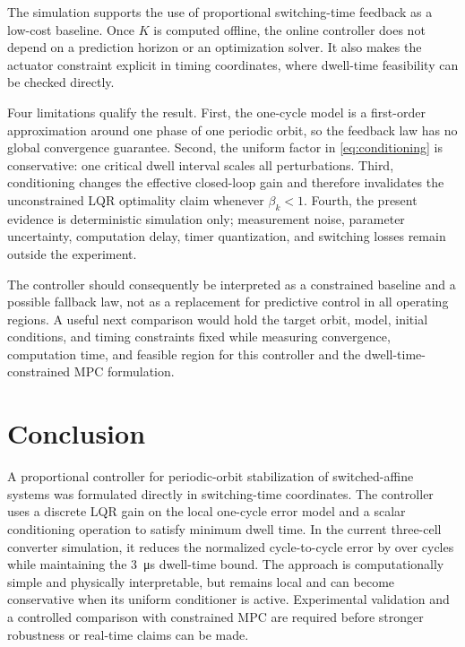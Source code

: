 \documentclass[11pt]{article}
\begin{document}
The simulation supports the use of proportional switching-time feedback as a low-cost baseline. Once $K$ is computed offline, the online controller does not depend on a prediction horizon or an optimization solver. It also makes the actuator constraint explicit in timing coordinates, where dwell-time feasibility can be checked directly.

Four limitations qualify the result. First, the one-cycle model is a first-order approximation around one phase of one periodic orbit, so the feedback law has no global convergence guarantee. Second, the uniform factor in \eqref{eq:conditioning} is conservative: one critical dwell interval scales all perturbations. Third, conditioning changes the effective closed-loop gain and therefore invalidates the unconstrained LQR optimality claim whenever $\beta_k<1$. Fourth, the present evidence is deterministic simulation only; measurement noise, parameter uncertainty, computation delay, timer quantization, and switching losses remain outside the experiment.

The controller should consequently be interpreted as a constrained baseline and a possible fallback law, not as a replacement for predictive control in all operating regions. A useful next comparison would hold the target orbit, model, initial conditions, and timing constraints fixed while measuring convergence, computation time, and feasible region for this controller and the dwell-time-constrained MPC formulation.

\section{Conclusion}

A proportional controller for periodic-orbit stabilization of switched-affine systems was formulated directly in switching-time coordinates. The controller uses a discrete LQR gain on the local one-cycle error model and a scalar conditioning operation to satisfy minimum dwell time. In the current three-cell converter simulation, it reduces the normalized cycle-to-cycle error by \ControlledErrorReduction{} over \SimulationCycles{} cycles while maintaining the \SI{3}{\micro\second} dwell-time bound. The approach is computationally simple and physically interpretable, but remains local and can become conservative when its uniform conditioner is active. Experimental validation and a controlled comparison with constrained MPC are required before stronger robustness or real-time claims can be made.



\end{document}
